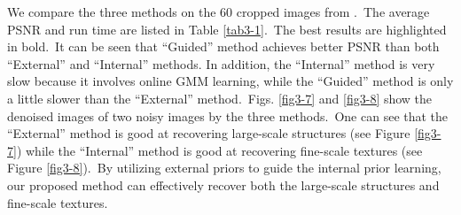 We compare the three methods on the 60 cropped images from \cite{crosschannel2016}.\ The average PSNR and run time are listed in Table \ref{tab3-1}.\ The best results are highlighted in bold.\ It can be seen that ``Guided'' method achieves better PSNR than both ``External'' and ``Internal'' methods. In addition, the ``Internal'' method is very slow because it involves online GMM learning, while the ``Guided'' method is only a little slower than the ``External'' method.\ Figs. \ref{fig3-7} and \ref{fig3-8} show the denoised images of two noisy images by the three methods.\ One can see that the  ``External'' method is good at recovering large-scale structures (see Figure \ref{fig3-7}) while the ``Internal'' method is good at recovering fine-scale textures (see Figure \ref{fig3-8}).\ By utilizing external priors to guide the internal prior learning, our proposed method can effectively recover both the large-scale structures and fine-scale textures. 

